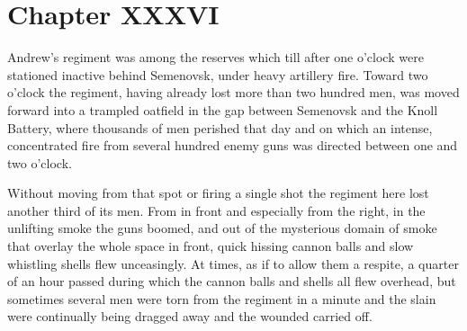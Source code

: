 \chapter*{Chapter XXXVI} \ifaudio {}
\fi

 Andrew's regiment was among the reserves which till after
one o'clock were stationed inactive behind Semenovsk, under heavy
artillery fire. Toward two o'clock the regiment, having already
lost more than two hundred men, was moved forward into a trampled
oatfield in the gap between Semenovsk and the Knoll Battery,
where thousands of men perished that day and on which an intense,
concentrated fire from several hundred enemy guns was directed
between one and two o'clock.

Without moving from that spot or firing a single shot the
regiment here lost another third of its men. From in front and
especially from the right, in the unlifting smoke the guns
boomed, and out of the mysterious domain of smoke that overlay
the whole space in front, quick hissing cannon balls and slow
whistling shells flew unceasingly. At times, as if to allow them
a respite, a quarter of an hour passed during which the cannon
balls and shells all flew overhead, but sometimes several men
were torn from the regiment in a minute and the slain were
continually being dragged away and the wounded carried off.

